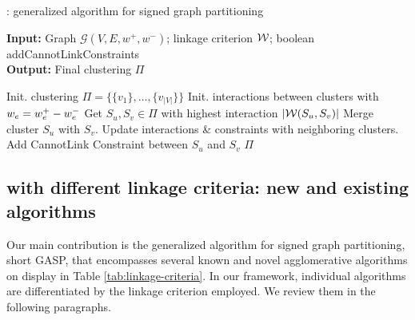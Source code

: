 \begin{algorithm}[t]
  \begin{flushleft}
  \caption{\algname{}: generalized algorithm for signed graph partitioning}
   \hspace*{\algorithmicindent} \textbf{Input:} Graph $\mathcal{G}(V,E,w^+,w^-)$; linkage criterion $\mathcal{W}{}$; boolean {\color{blue}addCannotLinkConstraints}  \\
  \hspace*{\algorithmicindent} \textbf{Output:} Final clustering $\Pi$\\
  \hspace*{\algorithmicindent} 
  \begin{algorithmic}[1]
  \footnotesize
      \State Init. clustering $\Pi=\{\{v_1\}, \ldots, \{v_{|V|}\}\}$
      \State Init. interactions between clusters with $w_e = w^+_e - w^-_e$
      \Repeat
        \State Get $S_u,S_v\in\Pi$ with highest interaction $|\mathcal{W}{}(S_u,S_v)|$
          \State Merge cluster $S_u$ with $S_v$.
          \State Update interactions \& constraints with neighboring clusters.
          \State Add CannotLink Constraint between $S_u$ and $S_v$
        \EndIf
      \State
      \Return $\Pi$
  \end{algorithmic}
    \label{main_alg}
  \end{flushleft}

\end{algorithm}


\subsection{\algname{} with different linkage criteria: new and existing algorithms} \label{sec:alg_update_rules}

Our main contribution is the generalized algorithm for signed graph partitioning, short GASP, that encompasses several known and novel agglomerative algorithms on display in Table \ref{tab:linkage-criteria}.
In our framework, individual algorithms are differentiated by the linkage criterion employed. We review them in the following paragraphs.

